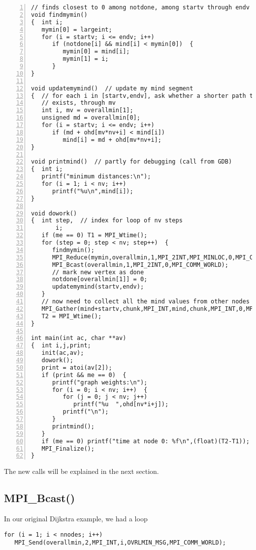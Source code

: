 \begin{Verbatim}[fontsize=\relsize{-2},numbers=left]
// finds closest to 0 among notdone, among startv through endv
void findmymin()
{  int i;
   mymin[0] = largeint; 
   for (i = startv; i <= endv; i++)
      if (notdone[i] && mind[i] < mymin[0])  {
         mymin[0] = mind[i];
         mymin[1] = i;
      }
}

void updatemymind()  // update my mind segment
{  // for each i in [startv,endv], ask whether a shorter path to i 
   // exists, through mv
   int i, mv = overallmin[1]; 
   unsigned md = overallmin[0];
   for (i = startv; i <= endv; i++)
      if (md + ohd[mv*nv+i] < mind[i])  
         mind[i] = md + ohd[mv*nv+i];
}

void printmind()  // partly for debugging (call from GDB)
{  int i;
   printf("minimum distances:\n");
   for (i = 1; i < nv; i++)
      printf("%u\n",mind[i]);
}

void dowork()
{  int step,  // index for loop of nv steps
       i;
   if (me == 0) T1 = MPI_Wtime();
   for (step = 0; step < nv; step++)  {
      findmymin();
      MPI_Reduce(mymin,overallmin,1,MPI_2INT,MPI_MINLOC,0,MPI_COMM_WORLD);
      MPI_Bcast(overallmin,1,MPI_2INT,0,MPI_COMM_WORLD);
      // mark new vertex as done 
      notdone[overallmin[1]] = 0;  
      updatemymind(startv,endv);
   }
   // now need to collect all the mind values from other nodes to node 0
   MPI_Gather(mind+startv,chunk,MPI_INT,mind,chunk,MPI_INT,0,MPI_COMM_WORLD);
   T2 = MPI_Wtime();
}

int main(int ac, char **av)
{  int i,j,print;
   init(ac,av);
   dowork();  
   print = atoi(av[2]);
   if (print && me == 0)  {
      printf("graph weights:\n");
      for (i = 0; i < nv; i++)  {
         for (j = 0; j < nv; j++)  
            printf("%u  ",ohd[nv*i+j]);
         printf("\n");
      }
      printmind();
   }
   if (me == 0) printf("time at node 0: %f\n",(float)(T2-T1));
   MPI_Finalize();
}
\end{Verbatim}

The new calls will be explained in the next section.

\subsection{MPI\_Bcast()}

In our original Dijkstra example, we had a loop

\begin{Verbatim}[fontsize=\relsize{-2}]
for (i = 1; i < nnodes; i++)  
   MPI_Send(overallmin,2,MPI_INT,i,OVRLMIN_MSG,MPI_COMM_WORLD);
\end{Verbatim}

